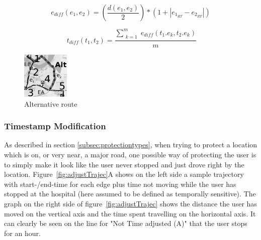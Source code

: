 \begin{equation}\label{eq:ediff}
e_{diff}(e_1,e_2) = \left( \frac{d\left(e_{1}, e_{2}\right)}{2} \right) * (1+|e_{1_{RT}} - e_{2_{RT}}|)
\end{equation}


\begin{equation}\label{eq:tdiff}
\;t_{diff}(t_1,t_2) = \frac{\sum_{\substack{k=1}}^m e_{diff}(t_1.e_k, t_2.e_k)}{m}
\end{equation}





\begin{figure}	
\center
	  \includegraphics[width=0.2\textwidth]{figures/map2.jpeg}
       \caption{Alternative route}
  \label{fig:altRoute}
\end{figure}


\subsubsection{Timestamp Modification} \label{subsec:timeMod}


As described in section \ref{subsec:protectiontypes}, when trying to protect a location which is on, or very near, a major road, one possible way of protecting the user is to simply make it look like the user never stopped and just drove right by the location. Figure~\ref{fig:adjustTrajec}A shows on the left side a sample trajectory with start-/end-time for each edge plus time not moving while the user has stopped at the hospital (here assumed to be defined as temporally sensitive). The graph on the right side of figure~\ref{fig:adjustTrajec} shows the distance the user has moved on the vertical axis and the time spent travelling on the horizontal axis. It can clearly be seen on the line for "Not Time adjusted (A)" that the user stops for an hour.

